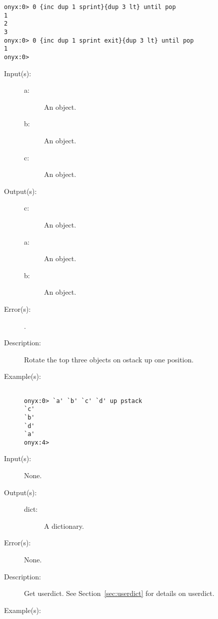 \begin{description}
\begin{description}
\begin{verbatim}
onyx:0> 0 {inc dup 1 sprint}{dup 3 lt} until pop
1
2
3
onyx:0> 0 {inc dup 1 sprint exit}{dup 3 lt} until pop
1
onyx:0>
		\end{verbatim}
	\end{description}
\label{systemdict:up}
\item[{\onyxop{a b c}{up}{c a b}}: ]
	\begin{description}\item[]
	\item[Input(s): ]
		\begin{description}\item[]
		\item[a: ]
			An object.
		\item[b: ]
			An object.
		\item[c: ]
			An object.
		\end{description}
	\item[Output(s): ]
		\begin{description}\item[]
		\item[c: ]
			An object.
		\item[a: ]
			An object.
		\item[b: ]
			An object.
		\end{description}
	\item[Error(s): ]
		\begin{description}\item[]
		\item[.]
		\end{description}
	\item[Description: ]
		Rotate the top three objects on ostack up one position.
	\item[Example(s): ]\begin{verbatim}

onyx:0> `a' `b' `c' `d' up pstack
`c'
`b'
`d'
`a'
onyx:4>
		\end{verbatim}
	\end{description}
\label{systemdict:userdict}
\item[{\onyxop{--}{userdict}{dict}}: ]
	\begin{description}\item[]
	\item[Input(s): ] None.
	\item[Output(s): ]
		\begin{description}\item[]
		\item[dict: ]
			A dictionary.
		\end{description}
	\item[Error(s): ] None.
	\item[Description: ]
		Get userdict.  See Section~\ref{sec:userdict} for details on
		userdict.
	\item[Example(s): ]\begin{verbatim}


\end{verbatim}
\end{description}
\end{description}
